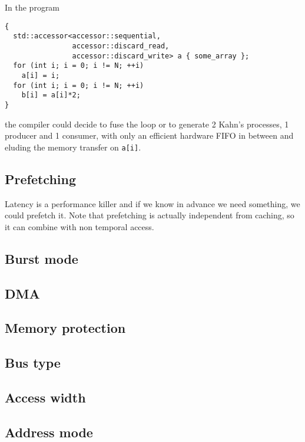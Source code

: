 \documentclass[a4paper]{article}
\begin{document}
In the program
\begin{lstlisting}
{
  std::accessor<accessor::sequential,
                accessor::discard_read,
                accessor::discard_write> a { some_array };
  for (int i; i = 0; i != N; ++i)
    a[i] = i;
  for (int i; i = 0; i != N; ++i)
    b[i] = a[i]*2;
}
\end{lstlisting}
the compiler could decide to fuse the loop or to generate 2 Kahn's
processes, 1 producer and 1 consumer, with only an efficient hardware
FIFO in between and eluding the memory transfer on \lstinline|a[i]|.


\subsection{Prefetching}
\label{sec:prefetching}

Latency is a performance killer and if we know in advance we need
something, we could prefetch it. Note that prefetching is actually
independent from caching, so it can combine with non temporal access.


\subsection{Burst mode}
\label{sec:burst-mode}

\subsection{DMA}
\label{sec:dma}

\subsection{Memory protection}
\label{sec:memory-protection}

\subsection{Bus type}
\label{sec:bus-type}

\subsection{Access width}
\label{sec:access-width}

\subsection{Address mode}
\label{sec:address-mode}
\end{document}
